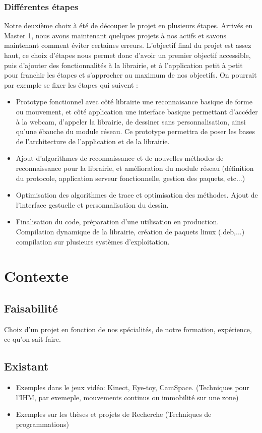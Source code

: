 \documentclass{article}
\begin{document}
				\subsubsection{Différentes étapes}
				Notre deuxième choix à été de découper le projet en plusieurs étapes. Arrivés en Master 1, nous avons maintenant quelques projets à nos actifs et savons maintenant comment éviter certaines erreurs. L'objectif final du projet est assez haut, ce choix d'étapes nous permet donc d'avoir un premier objectif accessible, puis d'ajouter des fonctionnalités à la librairie, et à l'application petit à petit pour franchir les étapes et s'approcher au maximum de nos objectifs. On pourrait par exemple se fixer les étapes qui suivent : \\
				\begin{itemize}
					\item{Prototype fonctionnel avec côté librairie une reconnaisance basique de forme ou mouvement, et côté application une interface basique permettant d'accéder à la webcam, d'appeler la librairie, de dessiner sans personnalisation, ainsi qu'une ébauche du module réseau. Ce prototype permettra de poser les bases de l'architecture de l'application et de la librairie.}
					\item{Ajout d'algorithmes de reconnaissance et de nouvelles méthodes de reconnaissance pour la librairie, et amélioration du module réseau (définition du protocole, application serveur fonctionnelle, gestion des paquets, etc...)}
					\item{Optimisation des algorithmes de trace et optimisation des méthodes. Ajout de l'interface gestuelle et personnalisation du dessin.}
					\item{Finalisation du code, préparation d'une utilisation en production. Compilation dynamique de la librairie, création de paquets linux (.deb,...) compilation sur plusieurs systèmes d'exploitation.}
				\end{itemize}
	\section{Contexte}
		\subsection{Faisabilité}
		Choix d'un projet en fonction de nos spécialités, de notre formation, expérience, ce qu'on sait faire.
		\subsection{Existant}
			\begin{itemize}
			\item Exemples dans le jeux vidéo: Kinect, Eye-toy, CamSpace. (Techniques pour l'IHM, par exemeple, mouvements continus ou immobilité sur une zone)
			\item Exemples sur les thèses et projets de Recherche (Techniques de programmations)
			\end{itemize}
\end{document}
